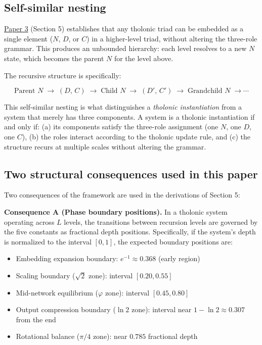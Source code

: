 \documentclass[12pt]{article}
\providecommand{\tightlist}{%
  \setlength{\itemsep}{0pt}\setlength{\parskip}{0pt}}
\begin{document}
\subsection{Self-similar nesting}\label{self-similar-nesting}

\href{https://github.com/baardev/truevalue/blob/main/docnav/Research/papers/3_minimal-recursive-triadic-framework/3_minimal-recursive-triadic-framework.pdf}{Paper
3} (Section 5) establishes that any tholonic triad can be embedded as a
single element (\(N\), \(D\), or \(C\)) in a higher-level triad, without
altering the three-role grammar. This produces an unbounded hierarchy:
each level resolves to a new \(N\) state, which becomes the parent \(N\)
for the level above.

The recursive structure is specifically:

\[\text{Parent } N \;\longrightarrow\; (D,\, C) \;\longrightarrow\; \text{Child } N \;\longrightarrow\; (D',\, C') \;\longrightarrow \;\text{Grandchild } N \;\longrightarrow \cdots\]

This self-similar nesting is what distinguishes a \emph{tholonic
instantiation} from a system that merely has three components. A system
is a tholonic instantiation if and only if: (a) its components satisfy
the three-role assignment (one \(N\), one \(D\), one \(C\)), (b) the
roles interact according to the tholonic update rule, and (c) the
structure recurs at multiple scales without altering the grammar.

\subsection{Two structural consequences used in this paper}\label{two-structural-consequences-used-in-this-paper}

Two consequences of the framework are used in the derivations of Section
5:

\textbf{Consequence A (Phase boundary positions).} In a tholonic system
operating across \(L\) levels, the transitions between recursion levels
are governed by the five constants as fractional depth positions.
Specifically, if the system's depth is normalized to the interval
\([0, 1]\), the expected boundary positions are:

\begin{itemize}
\tightlist
\item
  Embedding expansion boundary: \(e^{-1} \approx 0.368\) (early region)
\item
  Scaling boundary (\(\sqrt{2}\) zone): interval \([0.20, 0.55]\)
\item
  Mid-network equilibrium (\(\varphi\) zone): interval \([0.45, 0.80]\)
\item
  Output compression boundary (\(\ln 2\) zone): interval near
  \(1 - \ln 2 \approx 0.307\) from the end
\item
  Rotational balance (\(\pi/4\) zone): near \(0.785\) fractional depth
\end{itemize}
\end{document}

